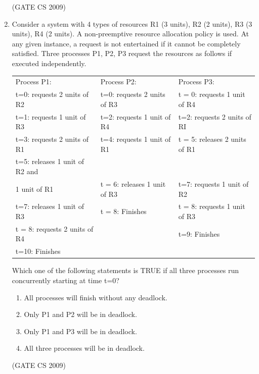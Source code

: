 \documentclass[a4paper, 11pt]{article}
\begin{document}
\begin{enumerate}
    \hfill (GATE CS 2009)

    \item Consider a system with 4 types of resources R1 (3 units), R2 (2 units), R3 (3 units), R4 (2 units). A non-preemptive resource allocation policy is used. At any given instance, a request is not entertained if it cannot be completely satisfied. Three processes P1, P2, P3 request the resources as follows if executed independently.\\
    \begin{tabular}{|l|l|l|}
    \hline
        Process P1: & Process P2: & Process P3: \\
        t=0: requests 2 units of R2 & t=0: requests 2 units of R3 & t = 0: requests 1 unit of R4 \\
        t=1: requests 1 unit of R3 & t=2: requests 1 unit of R4 & t=2: requests 2 units of RI \\
        t=3: requests 2 units of R1 & t=4: requests 1 unit of R1 & t = 5: releases 2 units of R1 \\
        t=5: releases 1 unit of R2 and\\ 1 unit of R1 & t = 6: releases 1 unit of R3 & t=7: requests 1 unit of R2 \\
        t=7: releases 1 unit of R3 & t = 8: Finishes & t = 8: requests 1 unit of R3 \\
        t = 8: requests 2 units of R4 &  &  t=9: Finishes \\
        t=10: Finishes &  & \\
        \hline
    \end{tabular}

    Which one of the following statements is TRUE if all three processes run concurrently starting at time t=0?
    \begin{enumerate} 
        \item All processes will finish without any deadlock.
        \item Only P1 and P2 will be in deadlock.
        \item Only P1 and P3 will be in deadlock.
        \item All three processes will be in deadlock.
    \end{enumerate}

    \hfill (GATE CS 2009)


\end{enumerate}
\end{document}

